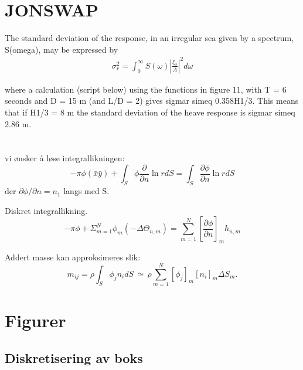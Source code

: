 
\section{JONSWAP}
The standard deviation of the response, in an irregular sea given by a spectrum, S(omega),
may be expressed by
\begin{align}
\sigma_r^2 = \int_0^{\infty} S(\omega) \left|\frac{\xi_2}{A}\right|^2d\omega
\end{align}

where a calculation (script below) using the functions in figure 11, with T = 6 seconds
and D = 15 m (and L/D = 2) gives sigmar simeq 0.358H1/3. This means that if H1/3 = 8 m the
standard deviation of the heave response is sigmar simeq 2.86 m.



\section{}
vi ønsker å løse integrallikningen:
\begin{equation}
    -\pi \phi(\bar{x}\bar{y})  + \int_{S} \phi  \frac{\partial }{\partial n} \ln r dS = \int_{S}  \frac{\partial \phi}{\partial n} \ln r dS
\end{equation}
der $\partial \phi / \partial n = n_1$ langs med S.

Diskret integrallikning.
\begin{equation}
    -\pi \phi  + \Sigma_{m=1}^N \phi_m (-\Delta \Theta_{n,m})   =  \sum_{m=1}^N [\frac{\partial \phi}{\partial n}]_m h_{n,m}
\end{equation}

Addert masse kan approksimeres slik:
\begin{equation}
    m_{ij}  = \rho \int_{S} \phi_j n_i dS \, \simeq \, \rho \sum_{m=1}^N [\phi_j]_m  [n_i]_m \Delta S_m.
\end{equation}


\section{Figurer}
\subsection{Diskretisering av boks}


